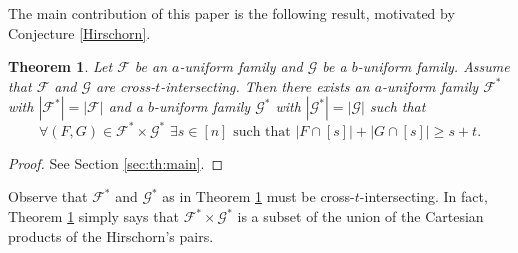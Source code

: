 \documentclass[12pt]{article}
\let\geq\geqslant
\let\ge\geq
\def\F{{\mathcal F}}
\def\G{{\mathcal G}}
\newtheorem{theorem}{Theorem}
\begin{document}
The main contribution of this paper is the following result, motivated by Conjecture \ref{Hirschorn}.
\begin{theorem}
\label{th:main}
Let $\F$ be an $a$-uniform family and $\G$ be a $b$-uniform family. Assume that $\F$ and $\G$ are cross-$t$-intersecting. Then there exists an $a$-uniform family $\F^*$ with $|\F^*| = |\F|$ and a $b$-uniform family $\G^*$ with $|\G^*| = |\G|$ such that 
$$\forall (F, G)\in \F^*\times \G^*\,\, \exists s\in [n]  \mbox{ such that } |F\cap[s]| + |G\cap[s]| \ge s + t.$$
\end{theorem}
\begin{proof}
See Section \ref{sec:th:main}.
\end{proof}
Observe that $\F^*$ and $\G^*$ as in Theorem \ref{th:main} must be cross-$t$-intersecting. In fact, Theorem \ref{th:main} simply says that $\F^*\times \G^*$ is a subset of the union of the Cartesian products of the Hirschorn's pairs.
\end{document}

